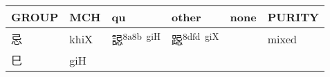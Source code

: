 \documentclass[14pt,a4paper]{scrartcl}
\begin{document}
\begin{longtable}[c]{@{}llllll@{}}
\toprule
\begin{minipage}[b]{0.14\columnwidth}\raggedright\strut
GROUP
\strut\end{minipage} &
\begin{minipage}[b]{0.14\columnwidth}\raggedright\strut
MCH
\strut\end{minipage} &
\begin{minipage}[b]{0.14\columnwidth}\raggedright\strut
qu
\strut\end{minipage} &
\begin{minipage}[b]{0.14\columnwidth}\raggedright\strut
other
\strut\end{minipage} &
\begin{minipage}[b]{0.14\columnwidth}\raggedright\strut
none
\strut\end{minipage} &
\begin{minipage}[b]{0.14\columnwidth}\raggedright\strut
PURITY
\strut\end{minipage}\tabularnewline
\midrule
\endhead
\begin{minipage}[t]{0.14\columnwidth}\raggedright\strut
忌
\strut\end{minipage} &
\begin{minipage}[t]{0.14\columnwidth}\raggedright\strut
khiX
\strut\end{minipage} &
\begin{minipage}[t]{0.14\columnwidth}\raggedright\strut
誋\textsuperscript{8a8b~giH}
\strut\end{minipage} &
\begin{minipage}[t]{0.14\columnwidth}\raggedright\strut
跽\textsuperscript{8dfd~giX}
\strut\end{minipage} &
\begin{minipage}[t]{0.14\columnwidth}\raggedright\strut
\strut\end{minipage} &
\begin{minipage}[t]{0.14\columnwidth}\raggedright\strut
mixed
\strut\end{minipage}\tabularnewline
\begin{minipage}[t]{0.14\columnwidth}\raggedright\strut
巳
\strut\end{minipage} &
\begin{minipage}[t]{0.14\columnwidth}\raggedright\strut
giH
\strut\end{minipage} &
\begin{minipage}[t]{0.14\columnwidth}\raggedright\strut
\strut\end{minipage} &

\end{longtable}
\end{document}
